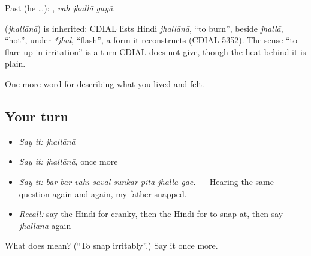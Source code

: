 Past (he …):   , \emph{vah jhallā gayā}.

\begin{cousinweb}
\textbf{} (\emph{jhallānā}) is inherited: CDIAL lists Hindi \emph{jhallānā}, \textquotedblleft{}to burn\textquotedblright{}, beside \emph{jhallā}, \textquotedblleft{}hot\textquotedblright{}, under \emph{*jhal}, \textquotedblleft{}flash\textquotedblright{}, a form it reconstructs (CDIAL 5352). The sense \textquotedblleft{}to flare up in irritation\textquotedblright{} is a turn CDIAL does not give, though the heat behind it is plain.
\end{cousinweb}

\begin{grammarlens}[title={What you've built}]
One more word for describing what you lived and felt.
\end{grammarlens}

\subsection*{Your turn}
\begin{itemize}
\raggedright
  \item \emph{Say it:} \emph{jhallānā}
  \item \emph{Say it:} \emph{jhallānā}, once more
  \item \emph{Say it:} \emph{bār bār vahī savāl sunkar pitā jhallā gae.} — Hearing the same question again and again, my father snapped.
  \item \emph{Recall:} say the Hindi for cranky, then the Hindi for to snap at, then say \emph{jhallānā} again
\end{itemize}

\begin{tcolorbox}[breakable,colback=teal!4,colframe=teal!35!black,title={Before you move on}]
What does  mean? (\textquotedblleft{}To snap irritably\textquotedblright{}.) Say it once more.
\end{tcolorbox}
